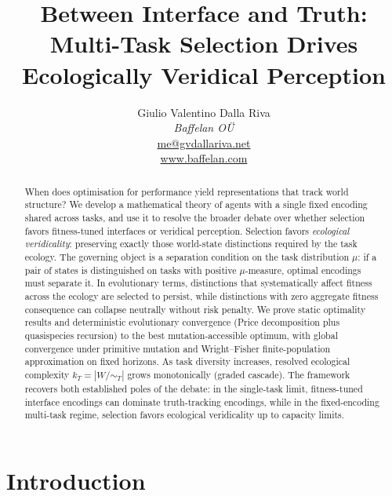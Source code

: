 \documentclass[12pt]{article}
\begin{document}
\title{Between Interface and Truth:\\Multi-Task Selection Drives Ecologically Veridical Perception}
\author{Giulio Valentino Dalla Riva\\[0.5ex]\textit{Baffelan O\"U}\\\href{mailto:me@gvdallariva.net}{me@gvdallariva.net}\\\href{https://www.baffelan.com}{www.baffelan.com}}
\date{}
\maketitle

\begin{abstract}
When does optimisation for performance yield representations that track world structure? We develop a mathematical theory of agents with a single fixed encoding shared across tasks, and use it to resolve the broader debate over whether selection favors fitness-tuned interfaces or veridical perception. Selection favors \emph{ecological veridicality}: preserving exactly those world-state distinctions required by the task ecology. The governing object is a separation condition on the task distribution $\mu$: if a pair of states is distinguished on tasks with positive $\mu$-measure, optimal encodings must separate it. In evolutionary terms, distinctions that systematically affect fitness across the ecology are selected to persist, while distinctions with zero aggregate fitness consequence can collapse neutrally without risk penalty. We prove static optimality results and deterministic evolutionary convergence (Price decomposition plus quasispecies recursion) to the best mutation-accessible optimum, with global convergence under primitive mutation and Wright--Fisher finite-population approximation on fixed horizons. As task diversity increases, resolved ecological complexity $k_T = |W/{\sim_T}|$ grows monotonically (graded cascade). The framework recovers both established poles of the debate: in the single-task limit, fitness-tuned interface encodings can dominate truth-tracking encodings, while in the fixed-encoding multi-task regime, selection favors ecological veridicality up to capacity limits.
\end{abstract}

\section{Introduction}\label{sec:intro}
\end{document}
